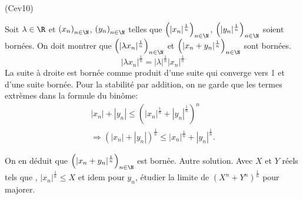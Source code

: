 \begin{tiny}(Cev10)\end{tiny} Soit $\lambda \in \R$ et $\left( x_n \right)_{n \in \N}$, $\left( y_n \right)_{n \in \N}$ telles que $\left( |x_n|^{\frac{1}{n}} \right)_{n \in \N}$, $\left( |y_n|^{\frac{1}{n}} \right)_{n \in \N}$ soient bornées. On doit montrer que $\left( |\lambda x_n|^{\frac{1}{n}} \right)_{n \in \N}$ et $\left( |x_n + y_n|^{\frac{1}{n}} \right)_{n \in \N}$ sont bornées.
\[
 |\lambda x_n|^{\frac{1}{n}} = |\lambda|^{\frac{1}{n}} |x_n|^{\frac{1}{n}}
\]
La suite à droite est bornée comme produit d'une suite qui converge vers 1 et d'une suite bornée. Pour la stabilité par addition, on ne garde que les termes extrèmes dans la formule du binôme:
\begin{multline*}
|x_n| + |y_n| \leq \left(|x_n|^{\frac{1}{n}} + |y_n|^{\frac{1}{n}}\right)^{n} \\
\Rightarrow
\left( |x_n| + |y_n|\right)^{\frac{1}{n}} \leq |x_n|^{\frac{1}{n}} + |y_n|^{\frac{1}{n}}. 
\end{multline*}

On en déduit que $\left( |x_n + y_n|^{\frac{1}{n}} \right)_{n \in \N}$ est bornée.\newline
Autre solution. Avec $X$ et $Y$ réels tels que , $|x_n|^{\frac{1}{n}} \leq X$ et idem pour $y_n$, étudier la limite de $(X^n + Y^n)^{\frac{1}{n}}$ pour majorer.
